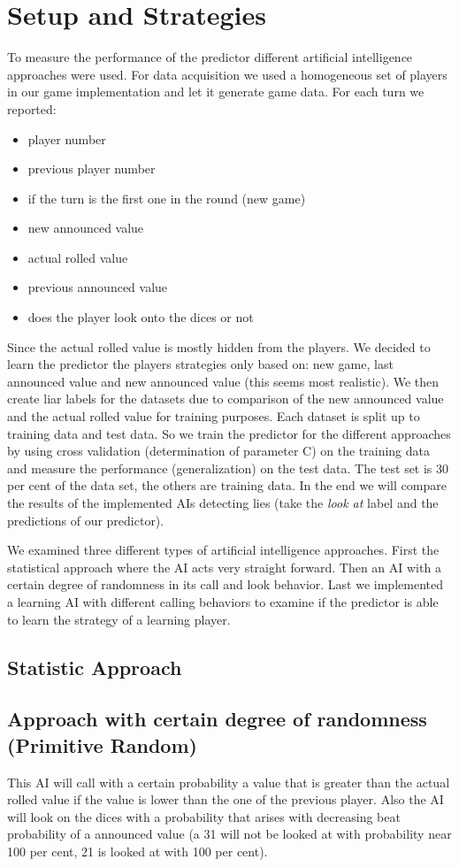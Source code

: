 \documentclass[11pt]{article}
\begin{document}
\section{Setup and Strategies}
To measure the performance of the predictor different artificial intelligence approaches were used. For data acquisition we used a homogeneous set of players in our game implementation and let it generate game data. For each turn we reported:
\begin{itemize}
	\item player number
	\item previous player number
	\item if the turn is the first one in the round (new game)
	\item new announced value
	\item actual rolled value
	\item previous announced value
	\item does the player look onto the dices or not
\end{itemize}
Since the actual rolled value is mostly hidden from the players. We decided to learn the predictor the players strategies only based on: new game, last announced value and new announced value (this seems most realistic).
We then create liar labels for the datasets due to comparison of the new announced value and the actual rolled value for training purposes.
Each dataset is split up to training data and test data. So we train the predictor for the different approaches by using cross validation (determination of parameter C) on the training data and measure the performance (generalization) on the test data. The test set is 30 per cent of the data set, the others are training data.
In the end we will compare the results of the implemented AIs detecting lies (take the \textit{look at} label and the predictions of our predictor).

We examined three different types of artificial intelligence approaches. First the statistical approach where the AI acts very straight forward. Then an AI with a certain degree of randomness in its call and look behavior. Last we implemented a learning AI with different calling behaviors to examine if the predictor is able to learn the strategy of a learning player.

\subsection{Statistic Approach}
\subsection{Approach with certain degree of randomness (Primitive Random)}
This AI will call with a certain probability a value that is greater than the actual rolled value if the value is lower than the one of the previous player. Also the AI will look on the dices with a probability that arises with decreasing beat probability of a announced value (a 31 will not be looked at with probability near 100 per cent, 21 is looked at with 100 per cent). 
\end{document}
